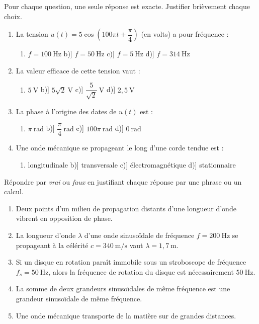 \documentclass[11pt]{article}
\begin{document}
\begin{exercice}
Pour chaque question, une seule réponse est exacte. Justifier brièvement chaque choix.
\begin{enumerate}
\item La tension $u(t) = 5\cos\left(100\pi t + \dfrac{\pi}{4}\right)$ (en volts) a pour fréquence :
\begin{enumerate}
\item[a)] $f = 100\ \text{Hz}$ \quad b)] $f = 50\ \text{Hz}$ \quad c)] $f = 5\ \text{Hz}$ \quad d)] $f = 314\ \text{Hz}$
\end{enumerate}
\item La valeur efficace de cette tension vaut :
\begin{enumerate}
\item[a)] $5\ \text{V}$ \quad b)] $5\sqrt{2}\ \text{V}$ \quad c)] $\dfrac{5}{\sqrt{2}}\ \text{V}$ \quad d)] $2{,}5\ \text{V}$
\end{enumerate}
\item La phase à l'origine des dates de $u(t)$ est :
\begin{enumerate}
\item[a)] $\pi\ \text{rad}$ \quad b)] $\dfrac{\pi}{4}\ \text{rad}$ \quad c)] $100\pi\ \text{rad}$ \quad d)] $0\ \text{rad}$
\end{enumerate}
\item Une onde mécanique se propageant le long d'une corde tendue est :
\begin{enumerate}
\item[a)] longitudinale \quad b)] transversale \quad c)] électromagnétique \quad d)] stationnaire
\end{enumerate}
\end{enumerate}
\end{exercice}

\begin{exercice}
Répondre par \emph{vrai} ou \emph{faux} en justifiant chaque réponse par une phrase ou un calcul.
\begin{enumerate}
\item Deux points d'un milieu de propagation distants d'une longueur d'onde vibrent en opposition de phase.
\item La longueur d'onde $\lambda$ d'une onde sinusoïdale de fréquence $f = 200\ \text{Hz}$ se propageant à la célérité $c = 340\ \text{m/s}$ vaut $\lambda = 1{,}7\ \text{m}$.
\item Si un disque en rotation paraît immobile sous un stroboscope de fréquence $f_s = 50\ \text{Hz}$, alors la fréquence de rotation du disque est nécessairement $50\ \text{Hz}$.
\item La somme de deux grandeurs sinusoïdales de même fréquence est une grandeur sinusoïdale de même fréquence.
\item Une onde mécanique transporte de la matière sur de grandes distances.
\end{enumerate}
\end{exercice}
\end{document}
